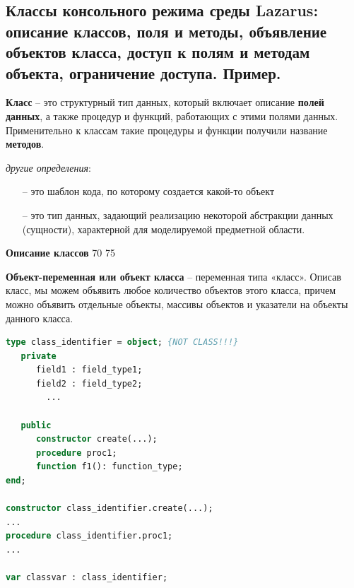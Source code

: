 



\newpage\subsection{Классы консольного режима среды Lazarus: описание классов, поля и методы, объявление 
объектов класса, доступ к полям и методам объекта, ограничение доступа. Пример. }

\begin{myquote}
            
\end{myquote}

{\bf Класс} – это структурный тип данных, который включает описание {\bf {полей данных}}, а также процедур и функций, работающих с этими полями данных. Применительно к классам такие процедуры и функции получили название {\bf методов}.

 \textit{другие определения}:

    \begin{itemize}
	    \item [–] это шаблон кода, по которому создается какой-то объект

        \item [–] это тип данных, задающий реализацию некоторой абстракции данных (сущности), характерной для моделируемой предметной области. 
    \end{itemize}

\noindent
{\bf {Описание классов}}
 {70}
 {75}

{\bf Объект-переменная или объект класса} – переменная типа «класс». Описав класс, мы можем объявить любое количество объектов этого 
класса, причем можно объявить отдельные объекты, массивы объектов и указатели на объекты данного класса.

\begin{lstlisting}[language=Pascal]
type class_identifier = object; {NOT CLASS!!!}
   private
      field1 : field_type1;  
      field2 : field_type2;  
        ...
   
   public
      constructor create(...);
      procedure proc1;  
      function f1(): function_type;
end;  

constructor class_identifier.create(...);
...
procedure class_identifier.proc1;  
...

var classvar : class_identifier;
\end{lstlisting}

